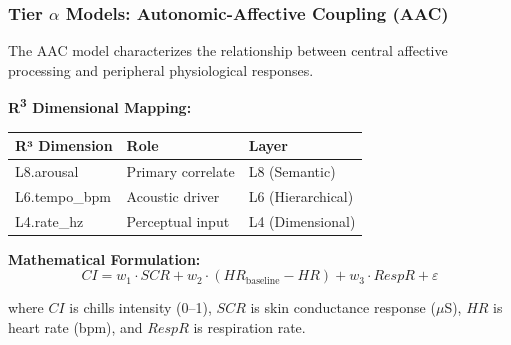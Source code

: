 \documentclass[9pt,onecolumn]{article}
\newcommand{\Rthree}{R\textsuperscript{3}}
\begin{document}
\begin{center}
\end{center}

\subsubsection{Tier $\alpha$ Models: Autonomic-Affective Coupling (AAC)}

The AAC model characterizes the relationship between central affective processing and peripheral physiological responses.

\textbf{\Rthree{} Dimensional Mapping:}
\begin{center}
\small
\begin{tabular}{@{}lll@{}}
\toprule
\textbf{R³ Dimension} & \textbf{Role} & \textbf{Layer} \\
\midrule
L8.arousal & Primary correlate & L8 (Semantic) \\
L6.tempo\_bpm & Acoustic driver & L6 (Hierarchical) \\
L4.rate\_hz & Perceptual input & L4 (Dimensional) \\
\bottomrule
\end{tabular}
\end{center}

\textbf{Mathematical Formulation:}
\begin{equation}
CI = w_1 \cdot SCR + w_2 \cdot (HR_{\text{baseline}} - HR) + w_3 \cdot RespR + \varepsilon
\label{eq:aac}
\end{equation}

where $CI$ is chills intensity (0--1), $SCR$ is skin conductance response ($\mu$S), $HR$ is heart rate (bpm), and $RespR$ is respiration rate.
\end{document}

